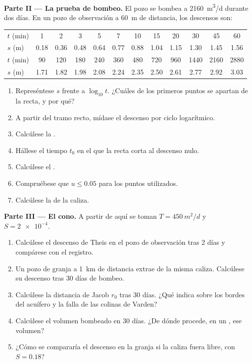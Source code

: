 \begin{problem}
\medskip\noindent\textbf{Parte II --- La prueba de bombeo.} El pozo se bombea
a \qty{2160}{m^3/d} durante dos días. En un pozo de observación a \qty{60}{m}
de distancia, los descensos son:
\begin{center}
\begin{tabular}{l*{11}{c}}
\hline
$t$ (\unit{min}) & 1 & 2 & 3 & 5 & 7 & 10 & 15 & 20 & 30 & 45 & 60\\
$s$ (\unit{m}) & 0.18 & 0.36 & 0.48 & 0.64 & 0.77 & 0.88 & 1.04 & 1.15 & 1.30 & 1.45 & 1.56\\
\hline
$t$ (\unit{min}) & 90 & 120 & 180 & 240 & 360 & 480 & 720 & 960 & 1440 & 2160 & 2880\\
$s$ (\unit{m}) & 1.71 & 1.82 & 1.98 & 2.08 & 2.24 & 2.35 & 2.50 & 2.61 & 2.77 & 2.92 & 3.03\\
\hline
\end{tabular}
\end{center}
\begin{enumerate}[resume]
\item Represéntese $s$ frente a $\log_{10}t$. ¿Cuáles de los primeros puntos se apartan de la
  recta, y por qué?
\item A partir del tramo recto, mídase el descenso por ciclo logarítmico.
\item Calcúlese la .
\item Hállese el tiempo $t_0$ en el que la recta corta al descenso nulo.
\item Calcúlese el .
\item Compruébese que $u \le 0.05$ para los puntos utilizados.
\item Calcúlese la  de la caliza.
\end{enumerate}

\medskip\noindent\textbf{Parte III --- El cono.} A partir de aquí se toman $T =
\qty{450}{m^2/d}$ y $S = \num{2e-4}$.
\begin{enumerate}[resume]
\item Calcúlese el descenso de Theis en el pozo de observación tras 2 días y
  compárese con el registro.
\item Un pozo de granja a \qty{1}{km} de distancia extrae de la misma caliza. Calcúlese su
  descenso tras 30 días de bombeo.
\item Calcúlese la distancia de Jacob $r_0$ tras 30 días. ¿Qué indica sobre
  los bordes del acuífero y la falla de las colinas de Varden?
\item Calcúlese el volumen bombeado en 30 días. ¿De dónde procede, en un ,
  ese volumen?
\item ¿Cómo se compararía el descenso en la granja si la caliza fuera
  libre, con $S = 0.18$?
\end{enumerate}


\end{problem}
